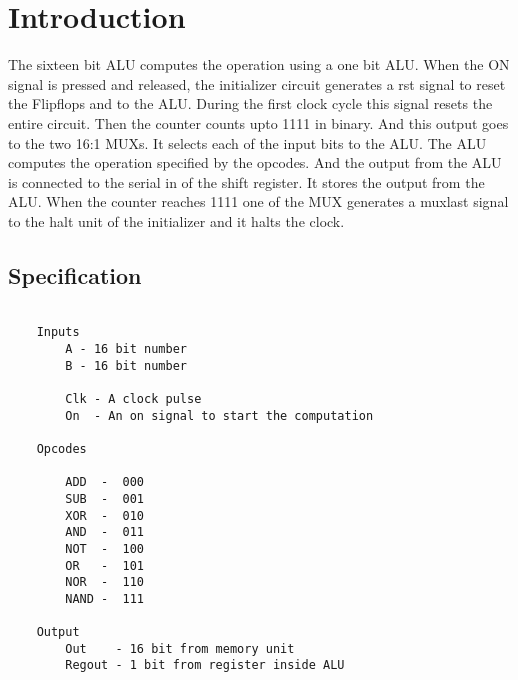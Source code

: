 \documentclass[../main]{subfiles}
\begin{document}
\chapter{Introduction}

The sixteen bit ALU computes the operation using a one bit ALU. When the ON
signal is pressed and released, the initializer circuit generates a rst signal
to reset the Flipflops and to the ALU. During the first clock cycle this signal
resets the entire circuit. Then the counter counts upto 1111 in binary. And
this output goes to the two 16:1 MUXs. It selects each of the input bits to the
ALU. The ALU computes the operation specified by the opcodes. And the output
from the ALU is connected to the serial in of the shift register. It stores the
output from the ALU. When the counter reaches 1111 one of the MUX generates a
muxlast signal to the halt unit of the initializer and it halts the clock.

\section {Specification}

\begin{verbatim}

    Inputs
        A - 16 bit number
        B - 16 bit number

        Clk - A clock pulse
        On  - An on signal to start the computation

    Opcodes

        ADD  -  000
        SUB  -  001
        XOR  -  010
        AND  -  011
        NOT  -  100
        OR   -  101
        NOR  -  110
        NAND -  111

    Output
        Out    - 16 bit from memory unit
        Regout - 1 bit from register inside ALU


\end{verbatim}
\end{document}
